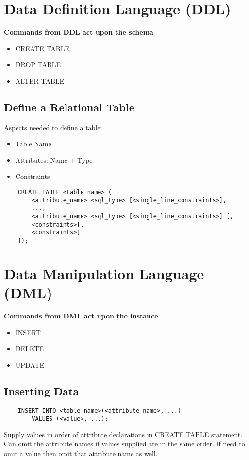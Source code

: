 \documentclass[twoside]{article}
\begin{document}
\section*{Data Definition Language (DDL)}

\textbf{Commands from DDL act upon the schema}
\begin{itemize}
    \item CREATE TABLE
    \item DROP TABLE
    \item ALTER TABLE
\end{itemize}

\subsection*{Define a Relational Table}
Aspects needed to define a table:
\begin{itemize}
    \item Table Name
    \item Attributes: Name + Type
    \item Constraints
\end{itemize}

\begin{verbatim}
    CREATE TABLE <table_name> (
        <attribute_name> <sql_type> [<single_line_constraints>],
        ...,
        <attribute_name> <sql_type> [<single_line_constraints>] [,
        <constraints>[,
        <constraints>]
    ]);
\end{verbatim}

\section*{Data Manipulation Language (DML)}

\textbf{Commands from DML act upon the instance.}
\begin{itemize}
    \item INSERT
    \item DELETE
    \item UPDATE
\end{itemize}

\subsection*{Inserting Data}
\begin{verbatim}
    INSERT INTO <table_name>(<attribute_name>, ...)
        VALUES (<value>, ...);
\end{verbatim}
Supply values in order of attribute declarations in CREATE TABLE statement.
Can omit the attribute names if values supplied are in the same order. If need to omit
a value then omit that attribute name as well.
\end{document}
